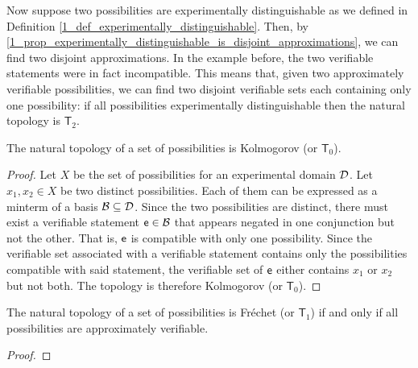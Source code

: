 \documentclass[11pt,letterpaper,fleqn]{memoir} %
\begin{document}
Now suppose two possibilities are experimentally distinguishable as we defined in Definition \ref{1_def_experimentally_distinguishable}. Then, by \ref{1_prop_experimentally_distinguishable_is_disjoint_approximations}, we can find two disjoint approximations. In the example before, the two verifiable statements were in fact incompatible. This means that, given two approximately verifiable possibilities, we can find two disjoint verifiable sets each containing only one possibility: if all possibilities experimentally distinguishable then the natural topology is $\mathsf{T}_2$.

\begin{mathSection}
	\begin{prop}
	The natural topology of a set of possibilities is Kolmogorov (or $\mathsf{T}_0$).
\end{prop}
\begin{proof}
	Let $X$ be the set of possibilities for an experimental domain $\edomain$. Let $x_1, x_2 \in X$ be two distinct possibilities. Each of them can be expressed as a minterm of a basis $\basis \subseteq \edomain$. Since the two possibilities are distinct, there must exist a verifiable statement $\stmt[e] \in \basis$ that appears negated in one conjunction but not the other. That is, $\stmt[e]$ is compatible with only one possibility. Since the verifiable set associated with a verifiable statement contains only the possibilities compatible with said statement, the verifiable set of $\stmt[e]$ either contains $x_1$ or $x_2$ but not both. The topology is therefore Kolmogorov (or $\mathsf{T}_0$).
\end{proof}
\begin{prop}
	The natural topology of a set of possibilities is Fr\'echet (or $\mathsf{T}_1$) if and only if all possibilities are approximately verifiable.
\end{prop}
\begin{proof}

\end{proof}
\end{mathSection}
\end{document}
